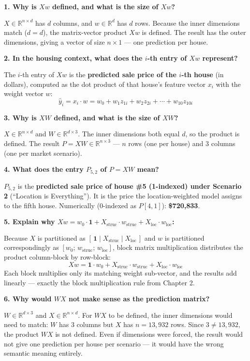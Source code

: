 \documentclass[11pt]{article}
\begin{document}
\textbf{1. Why is $Xw$ defined, and what is the size of $Xw$?}

$X \in \mathbb{R}^{n \times d}$ has $d$ columns, and $w \in \mathbb{R}^d$ has $d$ rows. Because the inner dimensions match ($d = d$), the matrix-vector product $Xw$ is defined. The result has the outer dimensions, giving a vector of size $n \times 1$ --- one prediction per house.

\textbf{2. In the housing context, what does the $i$-th entry of $Xw$ represent?}

The $i$-th entry of $Xw$ is the \textbf{predicted sale price of the $i$-th house} (in dollars), computed as the dot product of that house's feature vector $x_i$ with the weight vector $w$:
\[
\hat{y}_i = x_i \cdot w = w_0 + w_1 z_{1i} + w_2 z_{2i} + \cdots + w_{10} z_{10i}
\]

\textbf{3. Why is $XW$ defined, and what is the size of $XW$?}

$X \in \mathbb{R}^{n \times d}$ and $W \in \mathbb{R}^{d \times 3}$. The inner dimensions both equal $d$, so the product is defined. The result $P = XW \in \mathbb{R}^{n \times 3}$ --- $n$ rows (one per house) and 3 columns (one per market scenario).

\textbf{4. What does the entry $P_{5,2}$ of $P = XW$ mean?}

$P_{5,2}$ is the \textbf{predicted sale price of house \#5 (1-indexed) under Scenario 2} (``Location is Everything''). It is the price the location-weighted model assigns to the fifth house. Numerically (0-indexed as $P[4,1]$): \textbf{\$720,833}.

\textbf{5. Explain why $Xw = w_0 \cdot \mathbf{1} + X_{\text{struc}} \cdot w_{\text{struc}} + X_{\text{loc}} \cdot w_{\text{loc}}$:}

Because $X$ is partitioned as $[\,\mathbf{1}\;|\;X_{\text{struc}}\;|\;X_{\text{loc}}\,]$ and $w$ is partitioned correspondingly as $[w_0;\,w_{\text{struc}};\,w_{\text{loc}}]$, block matrix multiplication distributes the product column-block by row-block:
\[
Xw = \mathbf{1} \cdot w_0 + X_{\text{struc}} \cdot w_{\text{struc}} + X_{\text{loc}} \cdot w_{\text{loc}}
\]
Each block multiplies only its matching weight sub-vector, and the results add linearly --- exactly the block multiplication rule from Chapter 2.

\textbf{6. Why would $WX$ not make sense as the prediction matrix?}

$W \in \mathbb{R}^{d \times 3}$ and $X \in \mathbb{R}^{n \times d}$. For $WX$ to be defined, the inner dimensions would need to match: $W$ has 3 columns but $X$ has $n = 13{,}932$ rows. Since $3 \neq 13{,}932$, the product $WX$ is not defined. Even if dimensions were forced, the result would not give one prediction per house per scenario --- it would have the wrong semantic meaning entirely.
\end{document}
